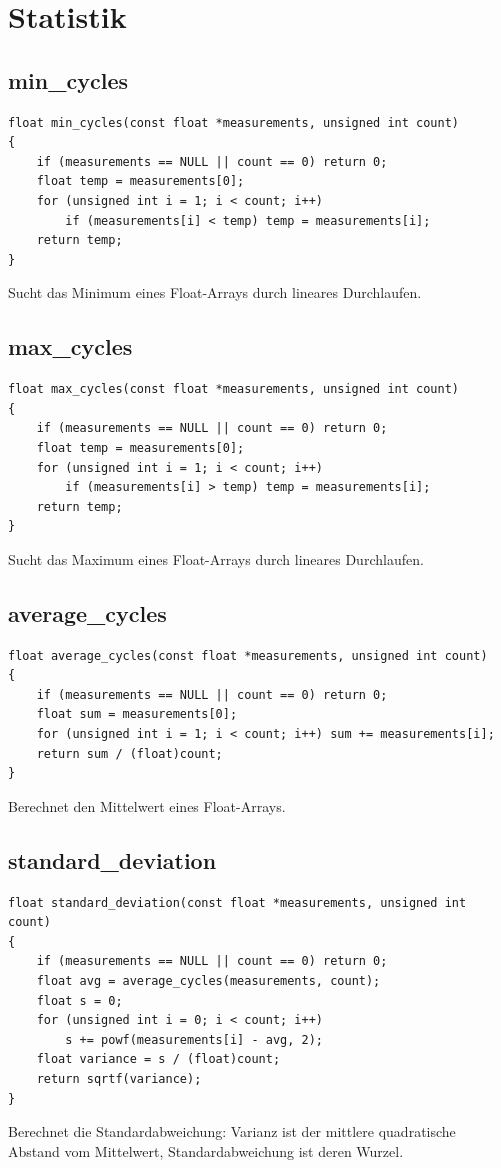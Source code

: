 \documentclass[10pt, a4paper]{article}
\begin{document}
\newpage
\section{Statistik}

\subsection{min\_cycles}
\begin{lstlisting}
float min_cycles(const float *measurements, unsigned int count)
{
    if (measurements == NULL || count == 0) return 0;
    float temp = measurements[0];
    for (unsigned int i = 1; i < count; i++)
        if (measurements[i] < temp) temp = measurements[i];
    return temp;
}
\end{lstlisting}
Sucht das Minimum eines Float-Arrays durch lineares Durchlaufen.

\subsection{max\_cycles}
\begin{lstlisting}
float max_cycles(const float *measurements, unsigned int count)
{
    if (measurements == NULL || count == 0) return 0;
    float temp = measurements[0];
    for (unsigned int i = 1; i < count; i++)
        if (measurements[i] > temp) temp = measurements[i];
    return temp;
}
\end{lstlisting}
Sucht das Maximum eines Float-Arrays durch lineares Durchlaufen.

\subsection{average\_cycles}
\begin{lstlisting}
float average_cycles(const float *measurements, unsigned int count)
{
    if (measurements == NULL || count == 0) return 0;
    float sum = measurements[0];
    for (unsigned int i = 1; i < count; i++) sum += measurements[i];
    return sum / (float)count;
}
\end{lstlisting}
Berechnet den Mittelwert eines Float-Arrays.

\subsection{standard\_deviation}
\begin{lstlisting}
float standard_deviation(const float *measurements, unsigned int count)
{
    if (measurements == NULL || count == 0) return 0;
    float avg = average_cycles(measurements, count);
    float s = 0;
    for (unsigned int i = 0; i < count; i++)
        s += powf(measurements[i] - avg, 2);
    float variance = s / (float)count;
    return sqrtf(variance);
}
\end{lstlisting}
Berechnet die Standardabweichung: Varianz ist der mittlere quadratische Abstand vom Mittelwert, Standardabweichung ist deren Wurzel.
\end{document}
